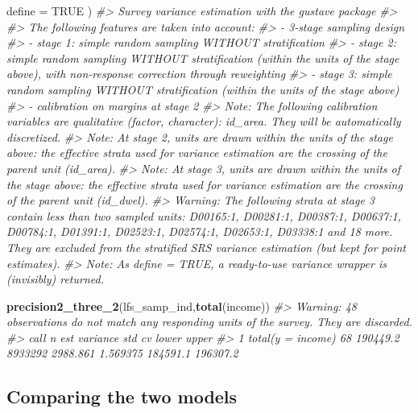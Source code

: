 \documentclass[
]{article}
\newenvironment{Shaded}{\begin{snugshade}}{\end{snugshade}}
\newcommand{\AttributeTok}[1]{\textcolor[rgb]{0.13,0.29,0.53}{#1}}
\newcommand{\CommentTok}[1]{\textcolor[rgb]{0.56,0.35,0.01}{\textit{#1}}}
\newcommand{\ConstantTok}[1]{\textcolor[rgb]{0.56,0.35,0.01}{#1}}
\newcommand{\FunctionTok}[1]{\textcolor[rgb]{0.13,0.29,0.53}{\textbf{#1}}}
\newcommand{\NormalTok}[1]{#1}
\begin{document}
\begin{Shaded}
\begin{Highlighting}[]
  \AttributeTok{define =} \ConstantTok{TRUE}
\NormalTok{)}
\CommentTok{\#\textgreater{} Survey variance estimation with the gustave package}
\CommentTok{\#\textgreater{} }
\CommentTok{\#\textgreater{} The following features are taken into account:}
\CommentTok{\#\textgreater{}   {-} 3{-}stage sampling design}
\CommentTok{\#\textgreater{}   {-} stage 1: simple random sampling WITHOUT stratification}
\CommentTok{\#\textgreater{}   {-} stage 2: simple random sampling WITHOUT stratification (within the units of the stage above), with non{-}response correction through reweighting}
\CommentTok{\#\textgreater{}   {-} stage 3: simple random sampling WITHOUT stratification (within the units of the stage above)}
\CommentTok{\#\textgreater{}   {-} calibration on margins at stage 2}
\CommentTok{\#\textgreater{} Note: The following calibration variables are qualitative (factor, character): id\_area. They will be automatically discretized.}
\CommentTok{\#\textgreater{} Note: At stage 2, units are drawn within the units of the stage above: the effective strata used for variance estimation are the crossing of the parent unit (id\_area).}
\CommentTok{\#\textgreater{} Note: At stage 3, units are drawn within the units of the stage above: the effective strata used for variance estimation are the crossing of the parent unit (id\_dwel).}
\CommentTok{\#\textgreater{} Warning: The following strata at stage 3 contain less than two sampled units: D00165:1, D00281:1, D00387:1, D00637:1, D00784:1, D01391:1, D02523:1, D02574:1, D02653:1, D03338:1 and 18 more. They are excluded from the stratified SRS variance estimation (but kept for point estimates).}
\CommentTok{\#\textgreater{} Note: As define = TRUE, a ready{-}to{-}use variance wrapper is (invisibly) returned.}

\FunctionTok{precision2\_three\_2}\NormalTok{(lfs\_samp\_ind,}\FunctionTok{total}\NormalTok{(income))}
\CommentTok{\#\textgreater{} Warning: 48 observations do not match any responding units of the survey. They are discarded.}
\CommentTok{\#\textgreater{}                call  n      est variance      std       cv    lower    upper}
\CommentTok{\#\textgreater{} 1 total(y = income) 68 190449.2  8933292 2988.861 1.569375 184591.1 196307.2}
\end{Highlighting}
\end{Shaded}

\subsection{Comparing the two models}\label{comparing-the-two-models}
\end{document}
